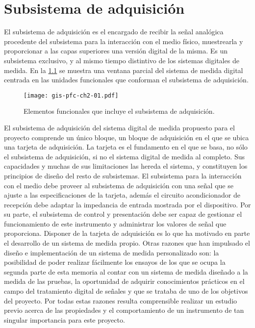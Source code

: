 \chapter{Subsistema de adquisición}\label{chap:acquisition}

El subsistema de adquisición es el encargado de recibir la señal analógica
procedente del subsistema para la interacción con el medio físico,
muestrearla y proporcionar a las capas superiores una versión digital de la
misma. Es un subsistema exclusivo, y al mismo tiempo distintivo de los
sistemas digitales de medida. En la \cref{fig:subacqui} se muestra una
ventana parcial del sistema de medida digital centrada en las unidades
funcionales que conforman el subsistema de adquisición.

\begin{figure}
	\begin{center}
		\texttt{[image: gis-pfc-ch2-01.pdf]}
	\end{center}
	\caption[Subsistema de adquisición] {Elementos funcionales que
	incluye el subsistema de adquisición.}
	\label{fig:subacqui}
\end{figure}

El subsistema de adquisición del sistema digital de medida propuesto para
el proyecto comprende un único bloque, un bloque de adquisición en el que
se ubica una tarjeta de adquisición. La tarjeta \kpci{} es el fundamento en
el que se basa, no sólo el subsistema de adquisición, si no el sistema
digital de medida al completo. Sus capacidades y muchas de sus limitaciones
las hereda el sistema, y constituyen los principios de diseño del resto de
subsistemas. El subsistema para la interacción con el medio debe proveer al
subsistema de adquisición con una señal que se ajuste a las
especificaciones de la tarjeta, además el circuito acondicionador de
recepción debe adaptar la impedancia de entrada mostrada por el
dispositivo. Por su parte, el subsistema de control y presentación debe ser
capaz de gestionar el funcionamiento de este instrumento y administrar los
valores de señal que proporciona. Disponer de la tarjeta de adquisición es
lo que ha motivado en parte el desarrollo de un sistema de medida propio.
Otras razones que han impulsado el diseño e implementación de un sistema de
medida personalizado son: la posibilidad de poder realizar fácilmente los
ensayos de los que se ocupa la segunda parte de esta memoria al contar con
un sistema de medida diseñado a la medida de las pruebas, la oportunidad de
adquirir conocimientos prácticos en el campo del tratamiento digital de
señales y que se trataba de uno de los objetivos del proyecto. Por todas
estas razones resulta comprensible realizar un estudio previo acerca de
las propiedades y el comportamiento de un instrumento de tan singular
importancia para este proyecto.

